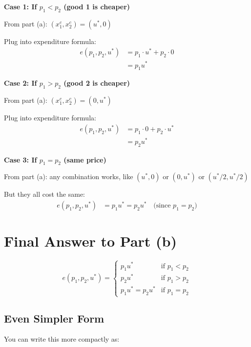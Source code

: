 \documentclass[11pt]{article}
\begin{document}
\textbf{Case 1: If $p_1 < p_2$ (good 1 is cheaper)}

From part (a): $(x_1^c, x_2^c) = (u^*, 0)$

Plug into expenditure formula:
\begin{align*}
e(p_1, p_2, u^*) &= p_1 \cdot u^* + p_2 \cdot 0 \\
&= p_1 u^*
\end{align*}

\textbf{Case 2: If $p_1 > p_2$ (good 2 is cheaper)}

From part (a): $(x_1^c, x_2^c) = (0, u^*)$

Plug into expenditure formula:
\begin{align*}
e(p_1, p_2, u^*) &= p_1 \cdot 0 + p_2 \cdot u^* \\
&= p_2 u^*
\end{align*}

\textbf{Case 3: If $p_1 = p_2$ (same price)}

From part (a): any combination works, like $(u^*, 0)$ or $(0, u^*)$ or $(u^*/2, u^*/2)$

But they all cost the same:
\begin{align*}
e(p_1, p_2, u^*) &= p_1 u^* = p_2 u^* \quad \text{(since $p_1 = p_2$)}
\end{align*}

\section{Final Answer to Part (b)}

\begin{tcolorbox}[colback=yellow!10!white,colframe=orange!75!black,title=Answer: Expenditure Function (Piecewise)]
\begin{equation}
e(p_1, p_2, u^*) = \begin{cases}
p_1 u^* & \text{if } p_1 < p_2 \\
p_2 u^* & \text{if } p_1 > p_2 \\
p_1 u^* = p_2 u^* & \text{if } p_1 = p_2
\end{cases}
\end{equation}
\end{tcolorbox}

\subsection{Even Simpler Form}

You can write this more compactly as:
\end{document}
